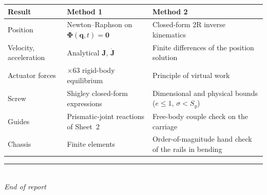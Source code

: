 \documentclass[11pt]{article}
\begin{document}
\begin{center}\small
\begin{tabular}{@{}>{\raggedright\arraybackslash}p{3.4cm}>{\raggedright\arraybackslash}p{6.1cm}>{\raggedright\arraybackslash}p{6.6cm}@{}}
\toprule
\textbf{Result} & \textbf{Method 1} & \textbf{Method 2} \\
\midrule
Position   & Newton--Raphson on $\bm\Phi(\bm q,t)=\bm 0$ & Closed-form 2R inverse kinematics \\
Velocity, acceleration & Analytical $\bm J$, $\dot{\bm J}$ & Finite differences of the position solution \\
Actuator forces & 60$\times$63 rigid-body equilibrium & Principle of virtual work \\
Screw & Shigley closed-form expressions & Dimensional and physical bounds ($e\le1$, $\sigma<S_y$) \\
Guides & Prismatic-joint reactions of Sheet~2 & Free-body couple check on the carriage \\
Chassis & Finite elements & Order-of-magnitude hand check of the rails in bending \\
\bottomrule
\end{tabular}
\end{center}

\vspace{8pt}
\begin{center}
\rule{0.6\textwidth}{0.4pt}\\[6pt]
\textit{End of report}
\end{center}
\end{document}
